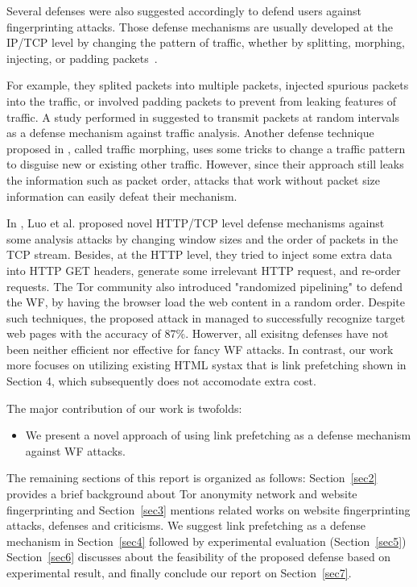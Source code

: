 Several defenses were also suggested accordingly to defend users against fingerprinting attacks.
Those defense mechanisms are usually developed at the IP/TCP level by changing the pattern of traffic, whether by splitting, morphing, injecting, or padding packets~\cite{luo2011, }.

For example, they splited packets into multiple packets, injected spurious packets into the traffic, or involved  padding packets to prevent from leaking features of traffic.
A study performed in \cite{fu2003} suggested to transmit packets at random intervals as a defense mechanism against traffic analysis.
Another defense technique proposed in \cite{wright2009}, called traffic morphing, uses some tricks to change a traffic pattern to disguise new or existing other traffic.
However, since their approach still leaks the information such as packet order, attacks that work without packet size information can easily defeat their mechanism.

In \cite{luo2011}, Luo et al. proposed novel HTTP/TCP level defense mechanisms against some analysis attacks by changing window sizes and the order of packets in the TCP stream.
Besides, at the HTTP level, they tried to inject some extra data into HTTP GET headers, generate some irrelevant HTTP request, and re-order requests.
The Tor community also introduced "randomized pipelining" \cite{perry11} to defend the WF, by having the browser load the web content in a random order.
Despite such techniques, the proposed attack in \cite{cai2012touching} managed to successfully recognize target web pages with the accuracy of 87\%. 
Howerver, all exisitng defenses have not been neither efficient nor effective for fancy WF attacks. %
In contrast, our work more focuses on utilizing existing HTML systax that is link prefetching shown in Section 4, which subsequently does not accomodate extra cost.



The major contribution of our work is twofolds:
\begin{itemize}
\item
We present a novel approach of using link prefetching as a defense mechanism against WF attacks.
\end{itemize}

The remaining sections of this report is organized as follows: Section~\ref{sec2} provides a brief background about Tor anonymity network and website fingerprinting and Section~\ref{sec3} mentions related works on website fingerprinting attacks, defenses and criticisms.
We suggest link prefetching as a defense mechanism in Section~\ref{sec4} followed by experimental evaluation (Section~\ref{sec5})
Section~\ref{sec6} discusses about the feasibility of the proposed defense based on experimental result, and finally conclude our report on Section~\ref{sec7}.

